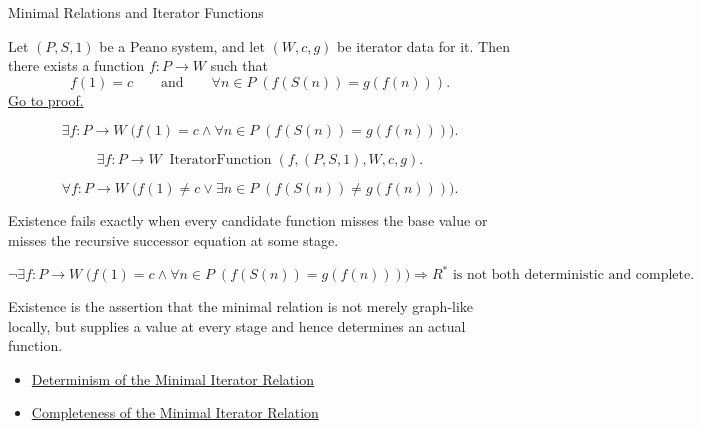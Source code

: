 \begin{topicbox}{Minimal Relations and Iterator Functions}
\begin{tcolorbox}[colback=lembox, colframe=lemborder, arc=2pt,
  left=6pt, right=6pt, top=4pt, bottom=4pt,
  title={\small\textbf{Lemma (Existence of an Iterator Function)}},
  fonttitle=\small\bfseries]
\begin{lemma}
\label{lem:existence-of-iterator-function}
Let $(P,S,1)$ be a Peano system, and let $(W,c,g)$ be iterator data for it.
Then there exists a function $f:P\to W$ such that
\[
f(1)=c
\qquad\text{and}\qquad
\forall n\in P\;(f(S(n))=g(f(n))).
\]
\hyperref[prf:existence-of-iterator-function]{Go to proof.}
\end{lemma}
\end{tcolorbox}

\begin{remark*}
\[
\exists f:P\to W\;
\bigl(f(1)=c\land \forall n\in P\;(f(S(n))=g(f(n)))\bigr).
\]
\end{remark*}

\begin{remark*}
\[
\exists f:P\to W\;
\operatorname{IteratorFunction}(f,(P,S,1),W,c,g).
\]
\end{remark*}

\begin{remark*}
\[
\forall f:P\to W\;
\bigl(f(1)\neq c\lor \exists n\in P\;(f(S(n))\neq g(f(n)))\bigr).
\]
\end{remark*}

\begin{remark*}
Existence fails exactly when every candidate function misses the base value or
misses the recursive successor equation at some stage.
\end{remark*}

\begin{remark*}
\[
\neg\exists f:P\to W\;
\bigl(f(1)=c\land \forall n\in P\;(f(S(n))=g(f(n)))\bigr)
\Longrightarrow
R^* \text{ is not both deterministic and complete}.
\]
\end{remark*}

\begin{remark*}[Interpretation]
Existence is the assertion that the minimal relation is not merely graph-like
locally, but supplies a value at every stage and hence determines an actual
function.
\end{remark*}

\begin{remark*}[Dependencies]
\begin{itemize}
  \item \hyperref[lem:minimal-iterator-relation-deterministic]{Determinism of the Minimal Iterator Relation}
  \item \hyperref[lem:minimal-iterator-relation-complete]{Completeness of the Minimal Iterator Relation}
\end{itemize}
\end{remark*}


\end{topicbox}
